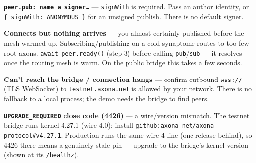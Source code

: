 \documentclass[
  nobib]{tufte-handout}
\begin{document}
\textbf{\texttt{peer.pub:\ name\ a\ signer…}} --- \texttt{signWith} is
required. Pass an author identity, or
\texttt{\{\ signWith:\ ANONYMOUS\ \}} for an unsigned publish. There is
no default signer.

\textbf{Connects but nothing arrives} --- you almost certainly published
before the mesh warmed up. Subscribing/publishing on a cold synaptome
routes to too few root axons. \texttt{await\ peer.ready()} (step 3)
before calling \texttt{pub}/\texttt{sub} --- it resolves once the
routing mesh is warm. On the public bridge this takes a few seconds.

\textbf{Can't reach the bridge / connection hangs} --- confirm outbound
\texttt{wss://} (TLS WebSocket) to \texttt{testnet.axona.net} is allowed
by your network. There is no fallback to a local process; the demo needs
the bridge to find peers.

\textbf{\texttt{UPGRADE\_REQUIRED} close code (4426)} --- a wire/version
mismatch. The testnet bridge runs kernel 4.27.1 (wire 4.0); install
\texttt{github:axona-net/axona-protocol\#v4.27.1}. Production runs the
same wire-4 line (one release behind), so 4426 there means a genuinely
stale pin --- upgrade to the bridge's kernel version (shown at its
\texttt{/healthz}).
\end{document}
